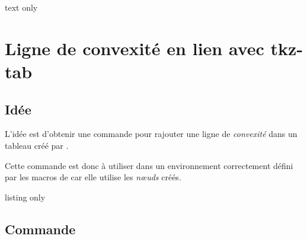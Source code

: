 \begin{PresCodeSortiePL}{text only}
\begin{center}
\end{center}
\end{PresCodeSortiePL}

\newpage

\section{Ligne de convexité en lien avec tkz-tab}\label{tkzconvex}

\subsection{Idée}

\begin{tipblock}
 L'idée est d'obtenir une commande pour rajouter une ligne de \textit{convexité} dans un tableau créé par .

Cette commande est donc à utiliser dans un environnement correctement défini par les macros de  car elle utilise les \textit{nœuds} créés.
\end{tipblock}

\begin{PresCodeTexPL}{listing only}
\end{PresCodeTexPL}

\subsection{Commande}


